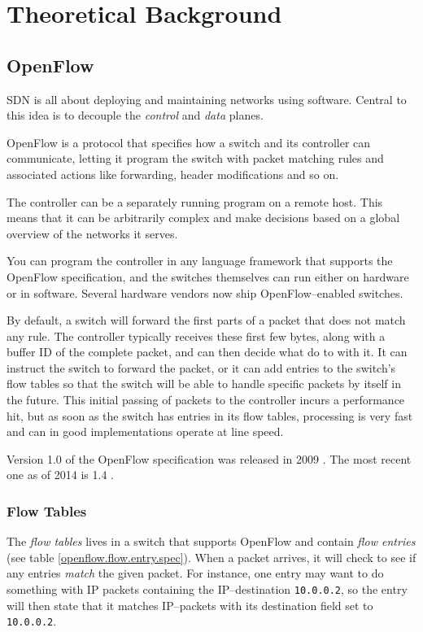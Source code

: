 \chapter{Theoretical Background}

\section{OpenFlow}

\acf{SDN} is all about deploying and maintaining networks using software.
Central to this idea is to decouple the \textit{control} and \textit{data}
planes.

OpenFlow is a protocol that specifies how a switch and its controller can
communicate, letting it program the switch with packet matching rules and
associated actions like forwarding, header modifications and so on.

The controller can be a separately running program on a remote host. This
means that it can be arbitrarily complex and make decisions based on a
global overview of the networks it serves.

You can program the controller in any language framework that supports the
OpenFlow specification, and the switches themselves can run either on
hardware or in software.  Several hardware vendors now ship
OpenFlow--enabled switches.

By default, a switch will forward the first parts of a packet that does not
match any rule.  The controller typically receives these first few bytes,
along with a buffer ID of the complete packet, and can then decide
what do to with it.  It can instruct the switch to forward the packet,
or it can add entries to the switch's flow tables so that the switch
will be able to handle specific packets by itself in the future.  This
initial passing of packets to the controller incurs a performance hit,
but as soon as the switch has entries in its flow tables, processing
is very fast and can in good implementations operate at line speed.

Version 1.0 of the OpenFlow specification was released in 2009
\cite{openflow-1.0} \cite{openflow-1.0.1} \cite{openflow-1.0.2}.
The most recent one as of 2014 is 1.4 \cite{openflow-1.4}.

\subsection{Flow Tables}

The \textit{flow tables} lives in a switch that supports OpenFlow and
contain \textit{flow entries} (see table \ref{openflow.flow.entry.spec}).
When a packet arrives, it will check to see
if any entries \textit{match} the given packet.  For instance, one entry may
want to do something with \ac{IP} packets containing the IP--destination
\texttt{10.0.0.2}, so the entry
will then state that it matches IP--packets with its destination field set
to \texttt{10.0.0.2}.

